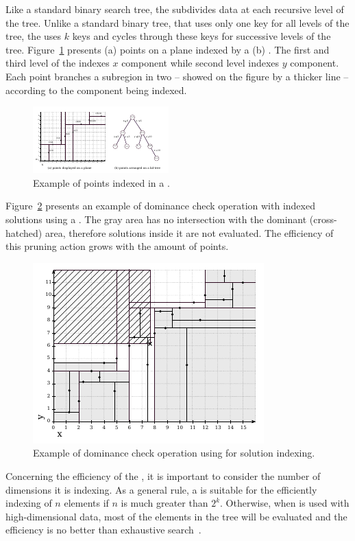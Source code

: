 Like a standard binary search tree, the \kdtree{} subdivides data at each
recursive level of the tree.
Unlike a standard binary tree, that uses only one key for all levels of the tree,
the \kdtree{} uses $k$ keys and cycles through these keys for successive levels
of the tree.
Figure~\ref{fig:kdom-kd} presents
(a) points on a plane
indexed by a (b) .
The first and third level of the  indexes $x$ component
while second level indexes $y$ component.
Each point branches a subregion in two -- showed on the figure by a
thicker line -- according to the component being indexed.

\begin{figure}[H]
  \centering
  \includegraphics[scale=3.8]{src/imgs/dom-kd}
  \caption{Example of points indexed in a \kdtree{}.}
  \label{fig:kdom-kd}
\end{figure}

Figure~\ref{fig:query} presents an example of dominance check operation with indexed
solutions using a .
The gray area has no intersection with the dominant (cross-hatched) area, therefore
solutions inside it are not evaluated.
The efficiency of this pruning action grows
with the amount of points.

\begin{figure}[H]
  \centering
  \includegraphics[scale=1.7]{src/imgs/query}
  \caption{Example of dominance check operation using \kdtree{} for solution indexing.}
  \label{fig:query}
\end{figure}

Concerning the efficiency of the \kdtree{}, it is important to
consider the number of dimensions it is indexing.
As a general rule, a \kdtree{} is suitable for the efficiently indexing of $n$ elements
if $n$ is much greater than $2^k$.
Otherwise, when \kdtree{} is used with high-dimensional data, most of the elements
in the tree will be evaluated and the efficiency is no better than exhaustive search~\cite{toth2004handbook}.

